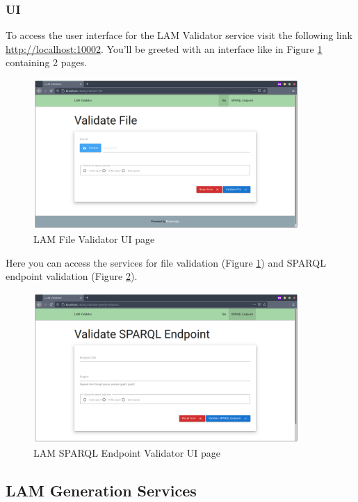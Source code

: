 \subsubsection{UI}
To access the user interface for the LAM Validator service visit the following link \url{http://localhost:10002}. You'll be greeted with an interface like in Figure \ref{fig:validator-ui-file} containing 2 pages.

\begin{figure}[H]
  \centering
  \includegraphics[width=0.9\textwidth]{images/usage/validator-ui-file.png}
  \caption{LAM File Validator UI page}
  \label{fig:validator-ui-file}
\end{figure} 

Here you can access the services for file validation (Figure \ref{fig:validator-ui-file}) and SPARQL endpoint validation (Figure \ref{fig:validator-ui-sparql}).

\begin{figure}[H]
  \centering
  \includegraphics[width=0.9\textwidth]{images/usage/validator-ui-sparql.png}
  \caption{LAM SPARQL Endpoint Validator UI page}
  \label{fig:validator-ui-sparql}
\end{figure} 

\subsection{LAM Generation Services}
